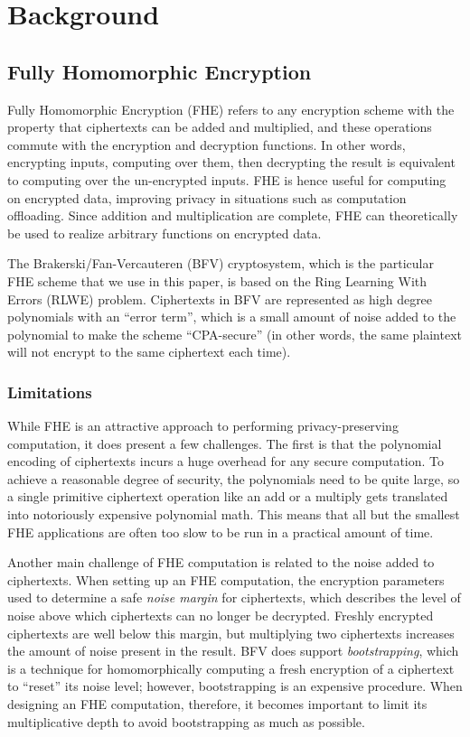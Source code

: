 \section{Background}\label{sec:background}
\subsection{Fully Homomorphic Encryption}
Fully Homomorphic Encryption (FHE) refers to any encryption scheme with the property that ciphertexts can be added and multiplied, and these operations commute with the encryption and decryption functions. \cite{Gentry}
In other words, encrypting inputs, computing over them, then decrypting the result is equivalent to computing over the un-encrypted inputs. FHE is hence useful for computing on encrypted data, improving privacy in situations such as computation offloading.
Since addition and multiplication are complete, FHE can theoretically be used to realize arbitrary functions on encrypted data.

The Brakerski/Fan-Vercauteren (BFV) \cite{BFV} cryptosystem, which is the particular FHE scheme that we use in this paper, is based on the Ring Learning With Errors (RLWE) problem.
Ciphertexts in BFV are represented as high degree polynomials with an ``error term'', which is a small amount of noise added to the polynomial to make the scheme ``CPA-secure'' (in other words, the same plaintext will not encrypt to the same ciphertext each time).
\subsubsection{Limitations}
While FHE is an attractive approach to performing privacy-preserving computation, it does present a few challenges.
The first is that the polynomial encoding of ciphertexts incurs a huge overhead for any secure computation.
To achieve a reasonable degree of security, the polynomials need to be quite large, so a single primitive ciphertext operation like an add or a multiply gets translated into notoriously expensive polynomial math.
This means that all but the smallest FHE applications are often too slow to be run in a practical amount of time.

Another main challenge of FHE computation is related to the noise added to ciphertexts.
When setting up an FHE computation, the encryption parameters used to determine a safe {\em noise margin} for ciphertexts, which describes the level of noise above which ciphertexts can no longer be decrypted.
Freshly encrypted ciphertexts are well below this margin, but multiplying two ciphertexts increases the amount of noise present in the result.
BFV does support {\em bootstrapping}, which is a technique for homomorphically computing a fresh encryption of a ciphertext to ``reset'' its noise level; however, bootstrapping is an expensive procedure.
When designing an FHE computation, therefore, it becomes important to limit its multiplicative depth to avoid bootstrapping as much as possible.


